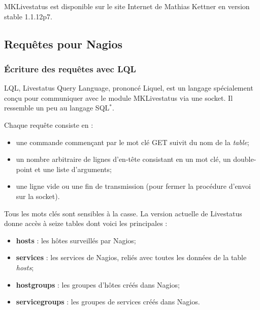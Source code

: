 \vspace{0.20cm}

MKLivestatus est disponible sur le site Internet\cite{biblio:siteMklivestatus} de Mathias Kettner en version stable 1.1.12p7.

\subsection{Requ\^etes pour Nagios}

\subsubsection{\'Ecriture des requ\^etes avec LQL}

LQL, Livestatus Query Language, prononc\'e \og Liquel\fg, est un langage sp\'ecialement con\c{c}u pour communiquer avec le module MKLivestatus via une socket.
Il ressemble un peu au langage SQL$^*$.

\noindent Chaque requ\^ete consiste en :

\begin{itemize}
	\item une commande commen\c{c}ant par le mot cl\'e \textsf{GET} suivit du nom de la \textit{table};
	\item un nombre arbitraire de lignes d'en-t\^ete consistant en un mot cl\'e, un double-point et une liste d'arguments;
	\item une ligne vide ou une fin de transmission (pour fermer la proc\'edure d'envoi sur la socket).

\end{itemize}

\vspace{0.20cm}

Tous les mots cl\'es sont sensibles \`a la casse. 
La version actuelle de Livestatus donne acc\`es \`a seize tables dont voici les principales :

\begin{itemize}
	\item \textbf{hosts} : les h\^otes surveill\'es par Nagios;
	\item \textbf{services} : les services de Nagios, reli\'es avec toutes les donn\'ees de la table \textit{hosts};
	\item \textbf{hostgroups} : les groupes d'h\^otes cr\'e\'es dans Nagios;
	\item \textbf{servicegroups} : les groupes de services cr\'e\'es dans Nagios.

\end{itemize}

